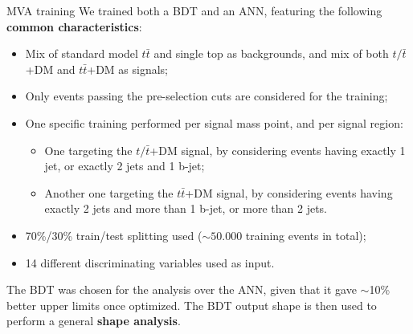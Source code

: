 \documentclass[8pt]{beamer}
\begin{document}
\begin{frame}{MVA training}
\justifying
We \alert{trained both a BDT and an ANN}, featuring the following \textbf{common characteristics}:
\vspace{-5pt}
\begin{itemize}
\justifying
\item Mix of standard model $t \bar t$ and single top as backgrounds, and mix of both $t/\bar t$+DM and $t \bar t$+DM as signals;
\item Only events passing the pre-selection cuts are considered for the training;
\item One specific training performed per signal mass point, and per signal region:
\begin{itemize}
\item One targeting the $t/\bar t$+DM signal, by considering events having exactly 1 jet, or exactly 2 jets and 1 b-jet;
\item Another one targeting the $t \bar t$+DM signal, by considering events having exactly 2 jets and more than 1 b-jet, or more than 2 jets.
\end{itemize}

\item 70\%/30\% train/test splitting used ($\sim 50.000$ training events in total);
\item 14 different discriminating variables used as input.
\end{itemize} \vfill

The \alert{BDT was chosen for the analysis} over the ANN, given that it gave $\sim$10\% better upper limits once optimized. \vfill
The BDT output shape is then used to perform a general \textbf{shape analysis}. \vfill
\end{frame}
\end{document}
